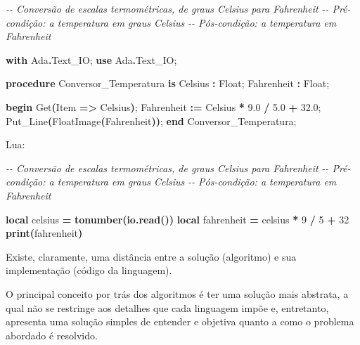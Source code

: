 \documentclass[
  11pt,
  a4paper,
]{scrbook}
\newenvironment{Shaded}{\begin{snugshade}}{\end{snugshade}}
\newcommand{\CommentTok}[1]{\textcolor[rgb]{0.56,0.35,0.01}{\textit{#1}}}
\newcommand{\DataTypeTok}[1]{\textcolor[rgb]{0.13,0.29,0.53}{#1}}
\newcommand{\DecValTok}[1]{\textcolor[rgb]{0.00,0.00,0.81}{#1}}
\newcommand{\FloatTok}[1]{\textcolor[rgb]{0.00,0.00,0.81}{#1}}
\newcommand{\FunctionTok}[1]{\textcolor[rgb]{0.13,0.29,0.53}{\textbf{#1}}}
\newcommand{\KeywordTok}[1]{\textcolor[rgb]{0.13,0.29,0.53}{\textbf{#1}}}
\newcommand{\NormalTok}[1]{#1}
\newcommand{\OperatorTok}[1]{\textcolor[rgb]{0.81,0.36,0.00}{\textbf{#1}}}
\newcommand{\VariableTok}[1]{\textcolor[rgb]{0.00,0.00,0.00}{#1}}
\begin{document}
\begin{Shaded}
\begin{Highlighting}[]
\CommentTok{{-}{-} Conversão de escalas termométricas, de graus Celsius para Fahrenheit}
\CommentTok{{-}{-} Pré{-}condição: a temperatura em graus Celsius}
\CommentTok{{-}{-} Pós{-}condição: a temperatura em Fahrenheit}

\KeywordTok{with}\NormalTok{ Ada}\OperatorTok{.}\NormalTok{Text\_IO; }\KeywordTok{use}\NormalTok{ Ada}\OperatorTok{.}\NormalTok{Text\_IO;}

\KeywordTok{procedure}\NormalTok{ Conversor\_Temperatura }\KeywordTok{is}
\NormalTok{   Celsius }\OperatorTok{:} \DataTypeTok{Float}\NormalTok{;}
\NormalTok{   Fahrenheit }\OperatorTok{:} \DataTypeTok{Float}\NormalTok{;}

\KeywordTok{begin}
\NormalTok{   Get}\OperatorTok{(}\NormalTok{Item }\OperatorTok{=\textgreater{}}\NormalTok{ Celsius}\OperatorTok{)}\NormalTok{;}
\NormalTok{   Fahrenheit }\OperatorTok{:=}\NormalTok{ Celsius }\OperatorTok{*} \FloatTok{9.0} \OperatorTok{/} \FloatTok{5.0} \OperatorTok{+} \FloatTok{32.0}\NormalTok{;}
\NormalTok{   Put\_Line}\OperatorTok{(}\NormalTok{Float\textquotesingle{}Image}\OperatorTok{(}\NormalTok{Fahrenheit}\OperatorTok{))}\NormalTok{;}
\KeywordTok{end}\NormalTok{ Conversor\_Temperatura;}
\end{Highlighting}
\end{Shaded}

Lua:

\begin{Shaded}
\begin{Highlighting}[]
\CommentTok{{-}{-} Conversão de escalas termométricas, de graus Celsius para Fahrenheit}
\CommentTok{{-}{-} Pré{-}condição: a temperatura em graus Celsius}
\CommentTok{{-}{-} Pós{-}condição: a temperatura em Fahrenheit}

\KeywordTok{local} \VariableTok{celsius} \OperatorTok{=} \FunctionTok{tonumber}\OperatorTok{(}\FunctionTok{io.read}\OperatorTok{())}
\KeywordTok{local} \VariableTok{fahrenheit} \OperatorTok{=} \VariableTok{celsius} \OperatorTok{*} \DecValTok{9} \OperatorTok{/} \DecValTok{5} \OperatorTok{+} \DecValTok{32}
\FunctionTok{print}\OperatorTok{(}\VariableTok{fahrenheit}\OperatorTok{)}
\end{Highlighting}
\end{Shaded}

Existe, claramente, uma distância entre a solução (algoritmo) e sua
implementação (código da linguagem).

O principal conceito por trás dos algoritmos é ter uma solução mais
abstrata, a qual não se restringe aos detalhes que cada linguagem impõe
e, entretanto, apresenta uma solução simples de entender e objetiva
quanto a como o problema abordado é resolvido.
\end{document}
